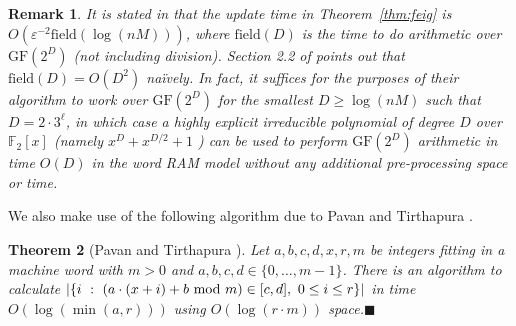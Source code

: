 \documentclass[letterpaper,11pt]{article}
\newcommand{\eps}{\varepsilon}
\newcommand{\GF}{\mathrm{GF}}
\renewcommand{\mod}{\hbox{ mod }}
\newcommand{\TheoremName}[1]{\label{thm:#1}}
\newcommand{\Theorem}[1]{Theorem~\ref{thm:#1}}
\newtheorem{theorem}{Theorem}\newtheorem{corollary}[theorem]{Corollary}
\newtheorem{remark}[theorem]{Remark}
\newcommand{\proofbelow}{3pt}
\newcommand{\afterproof}{\hfill $\blacksquare$ \par \vspace{\proofbelow}}
\begin{document}
\begin{remark}
It is stated in \cite{FKSV02} that the update time
in \Theorem{feig} is $O(\eps^{-2}\mathrm{field}(\log(nM)))$,
where $\mathrm{field}(D)$ is the time to do arithmetic over
$\GF(2^D)$ (not including division).  Section 2.2 of
\cite{FKSV02} points out that
$\mathrm{field}(D) = O(D^2)$ na\"{i}vely. In fact, it suffices for the
purposes of their algorithm to work over $\GF(2^D)$ for the smallest
$D\ge\log(nM)$ such that $D = 2\cdot 3^{\ell}$, in which case a highly
explicit irreducible polynomial of degree $D$ over $\mathbb{F}_2[x]$
(namely $x^D + x^{D/2} + 1$ \cite[Theorem 1.1.28]{vanLint99})
can be used to perform $\GF(2^D)$ arithmetic in time
$O(D)$ in the word RAM model without any additional pre-processing
space or time.
\end{remark}

We also make use of the following algorithm due to Pavan and
Tirthapura \cite{PavanTir07}.

\begin{theorem}[Pavan and Tirthapura {\cite[Theorem
    2]{PavanTir07}}]\TheoremName{pavan}
Let $a,b,c,d,x,r,m$ be integers fitting in a machine word with $m>0$
and $a,b,c,d\in\{0,\ldots,m-1\}$.  There is an algorithm to
calculate $|\{i \ :\ (a\cdot(x+i) + b\mod m)\in [c, d],\ 0\le i\le r\}|$ in
time $O(\log(\min(a, r)))$ using $O(\log(r\cdot m))$
space.\afterproof
\end{theorem}
\end{document}
